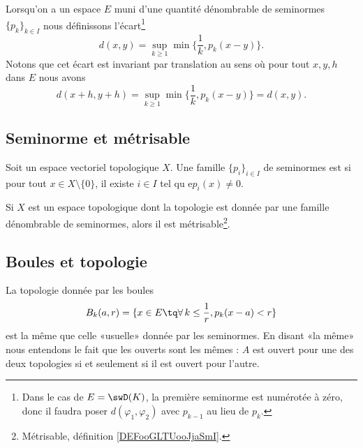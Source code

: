 Lorsqu'on a un espace \( E\) muni d'une quantité dénombrable de seminormes \( \{ p_k \}_{k\in I}\) nous définissons l'écart\footnote{Dans le cas de \( E=\swD(K)\), la première seminorme est numérotée à zéro, donc il faudra poser \( d(\varphi_1,\varphi_2)\) avec \( p_{k-1}\) au lieu de \( p_k\).}
\begin{equation}        \label{EqAAghiUR}
	d(x,y)=\sup_{k\geq 1}\min\big\{  \frac{1}{ k },p_k(x-y) \big\}.
\end{equation}
Notons que cet écart est invariant par translation au sens où pour tout \( x,y,h\) dans \( E\) nous avons
\begin{equation}
	d(x+h,y+h)=\sup_{k\geq 1}\min\big\{ \frac{1}{ k },p_k(x-y) \big\}=d(x,y).
\end{equation}

\subsection{Seminorme et métrisable}

\begin{definition}
	Soit un espace vectoriel topologique \( X\). Une famille \( \{ p_i \}_{i\in I}\) de seminormes est  si pour tout \( x\in X\setminus\{ 0 \}\), il existe \( i\in I\) tel qu e\( p_i(x)\neq 0\).
\end{definition}

\begin{proposition}     \label{PROPooMJEQooHtIyeX}
	Si \( X\) est un espace topologique dont la topologie est donnée par une famille dénombrable de seminormes, alors il est métrisable\footnote{Métrisable, définition \ref{DEFooGLTUooJjaSmI}.}.
\end{proposition}
\ssdem


\subsection{Boules et topologie}

\begin{proposition} \label{PropLOwUvCO}
	La topologie donnée par les boules
	\begin{equation}    \label{EqGHfYIlQ}
		B_k(a,r)=\{ x\in E\tq \forall\,k\leq \frac{1}{ r },p_k(x-a)<r\}
	\end{equation}
	est la même que celle «usuelle» donnée par les seminormes. En disant «la même» nous entendons le fait que les ouverts sont les mêmes : \( A\) est ouvert pour une des deux topologies si et seulement si il est ouvert pour l'autre.
\end{proposition}

